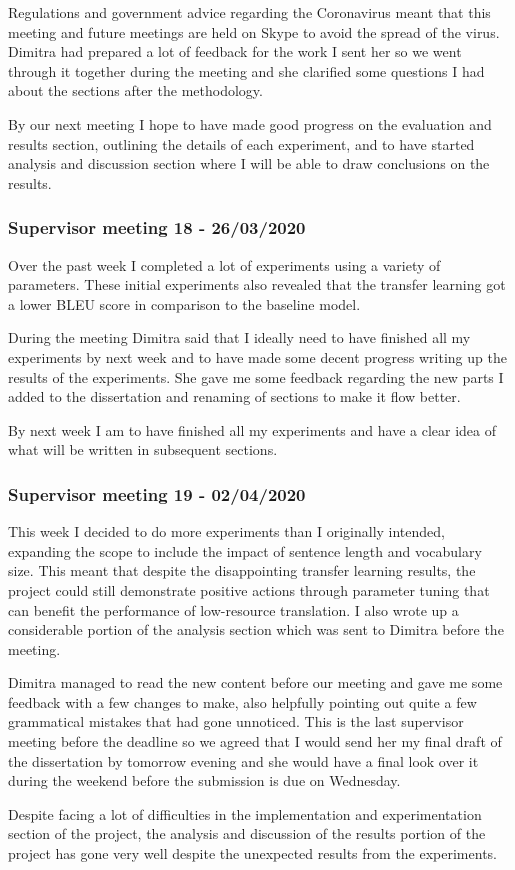 Regulations and government advice regarding the Coronavirus meant that this meeting and future meetings are held on Skype to avoid the spread of the virus. Dimitra had prepared a lot of feedback for the work I sent her so we went through it together during the meeting and she clarified some questions I had about the sections after the methodology.

By our next meeting I hope to have made good progress on the evaluation and results section, outlining the details of each experiment, and to have started analysis and discussion section where I will be able to draw conclusions on the results.


\subsubsection{Supervisor meeting 18 - 26/03/2020}
Over the past week I completed a lot of experiments using a variety of parameters. These initial experiments also revealed that the transfer learning got a lower \acrshort{BLEU} score in comparison to the baseline model.

During the meeting Dimitra said that I ideally need to have finished all my experiments by next week and to have made some decent progress writing up the results of the experiments. She gave me some feedback regarding the new parts I added to the dissertation and renaming of sections to make it flow better.

By next week I am to have finished all my experiments and have a clear idea of what will be written in subsequent sections.


\subsubsection{Supervisor meeting 19 - 02/04/2020}

This week I decided to do more experiments than I originally intended, expanding the scope to include the impact of sentence length and vocabulary size. This meant that despite the disappointing transfer learning results, the project could still demonstrate positive actions through parameter tuning that can benefit the performance of low-resource translation. I also wrote up a considerable portion of the analysis section which was sent to Dimitra before the meeting.

Dimitra managed to read the new content before our meeting and gave me some feedback with a few changes to make, also helpfully pointing out quite a few grammatical mistakes that had gone unnoticed. This is the last supervisor meeting before the deadline so we agreed that I would send her my final draft of the dissertation by tomorrow evening and she would have a final look over it during the weekend before the submission is due on Wednesday.

Despite facing a lot of difficulties in the implementation and experimentation section of the project, the analysis and discussion of the results portion of the project has gone very well despite the unexpected results from the experiments.